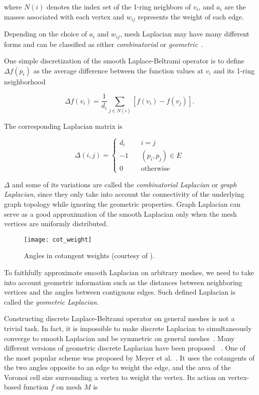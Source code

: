 where $N(i)$ denotes the index set of the 1-ring neighbors of $v_i$,
and $a_i$ are the masses associated with each vertex and $w_{ij}$
represents the weight of each edge.

Depending on the choice of $a_i$ and $w_{ij}$, mesh Laplacian may have
many different forms and can be classified as either
\emph{combinatorial} or \emph{geometric}~\cite{Zhang:2010:CGF}.

One simple discretization of the smooth Laplace-Beltrami operator is to
define $\Delta f(p_i)$ as the average difference between the function
values at $v_i$ and its 1-ring neighborhood

\begin{equation}
\Delta f(v_i)=\frac{1}{d_i}\sum_{j\in N(i)} [f(v_i)-f(v_j)].
\end{equation}

The corresponding Laplacian matrix is

\begin{equation}
\Delta(i,j)=\left\{
    \begin{array}{lc}
    d_i\quad & i=j \\
    -1\quad & (p_i,p_j)\in E \\
    0\quad & \text{otherwise}
    \end{array}
\right.
\end{equation}

$\Delta$ and some of its variations are called the \emph{combinatorial Laplacian}
or \emph{graph Laplacian}, since they only take into account the connectivity
of the underlying graph topology while ignoring the geometric properties.
Graph Laplacian can serve as a good approximation of the smooth Laplacian only
when the mesh vertices are uniformly distributed.

\begin{figure}
  \centering
  \texttt{[image: cot\_weight]}
  \caption[Angles in cotangent weights]{Angles in cotangent weights (courtesy of \cite{Sorkine:EG:2005}).}
\label{fig:cotweights}
\end{figure}

To faithfully approximate smooth Laplacian on arbitrary meshes, we need to take
into account geometric information such as the distances between neighboring
vertices and the angles between contiguous edges. Such defined Laplacian is
called the \emph{geometric Laplacian}.

Constructing discrete Laplace-Beltrami operator on general meshes is not a trivial task.
In fact, it is impossible to make discrete Laplacian to simultaneously converge to smooth
Laplacian and be symmetric on general meshes~\cite{Rustamov:2007:LEF}. Many different
versions of geometric discrete Laplacian have been proposed
~\cite{pinkall1993computing, Desbrun1999, Xu:2004:GMP, Levy2006, Vallet2008, Belkin:2008:SCG}.
One of the most popular scheme was proposed by Meyer et al.~\cite{Meyer2003}.
It uses the cotangents of the two angles opposite to an edge to weight the edge,
and the area of the Voronoi cell size surrounding a vertex to weight the vertex.
Its action on vertex-based function $f$ on mesh $M$ is

